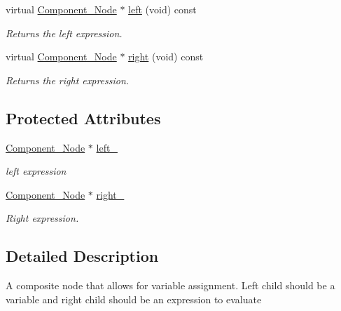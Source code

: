 \begin{DoxyCompactItemize}
virtual \hyperlink{classMadara_1_1Expression__Tree_1_1Component__Node}{Component\_\-Node} $\ast$ \hyperlink{classMadara_1_1Expression__Tree_1_1Composite__Binary__Node_a6ca5cccbc46ccc6026c18f9665298380}{left} (void) const 
\begin{DoxyCompactList}\small\item\em Returns the left expression. \item\end{DoxyCompactList}\item 
virtual \hyperlink{classMadara_1_1Expression__Tree_1_1Component__Node}{Component\_\-Node} $\ast$ \hyperlink{classMadara_1_1Expression__Tree_1_1Composite__Unary__Node_ade55cde5707e0fa73ab1c019159b9aec}{right} (void) const 
\begin{DoxyCompactList}\small\item\em Returns the right expression. \item\end{DoxyCompactList}\end{DoxyCompactItemize}
\subsection*{Protected Attributes}
\begin{DoxyCompactItemize}
\item 
\hyperlink{classMadara_1_1Expression__Tree_1_1Component__Node}{Component\_\-Node} $\ast$ \hyperlink{classMadara_1_1Expression__Tree_1_1Composite__Binary__Node_acac60a70beb2484737e6e7161edb2d1b}{left\_\-}
\begin{DoxyCompactList}\small\item\em left expression \item\end{DoxyCompactList}\item 
\hyperlink{classMadara_1_1Expression__Tree_1_1Component__Node}{Component\_\-Node} $\ast$ \hyperlink{classMadara_1_1Expression__Tree_1_1Composite__Unary__Node_a077b7bd1b52df6f5c6adfde735556a68}{right\_\-}
\begin{DoxyCompactList}\small\item\em Right expression. \item\end{DoxyCompactList}\end{DoxyCompactItemize}


\subsection{Detailed Description}
A composite node that allows for variable assignment. Left child should be a variable and right child should be an expression to evaluate 

